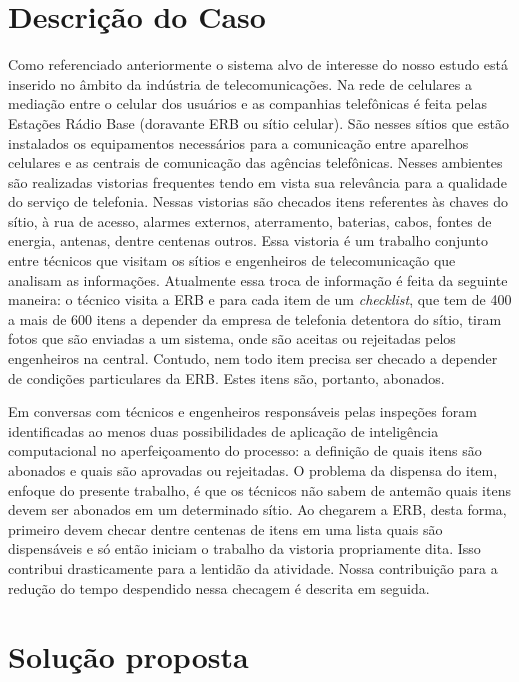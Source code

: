\documentclass[
	12pt,				%
	openany,			%
	oneside,			%
	a4paper,			%
	english,			%
	french,				%
	spanish,			%
	brazil,				%
	]{abntex2}
\begin{document}
\chapter[Descrição do Caso]{Descrição do Caso}
Como referenciado anteriormente o sistema alvo de interesse do nosso estudo está
inserido no âmbito da indústria de telecomunicações. Na rede de celulares a
mediação entre o celular dos usuários e as companhias telefônicas é feita pelas
Estações Rádio Base (doravante ERB ou sítio celular). São nesses sítios que
estão instalados os equipamentos necessários para a comunicação entre aparelhos
celulares e as centrais de comunicação das agências telefônicas. Nesses
ambientes são realizadas vistorias frequentes tendo em vista sua relevância para
a qualidade do serviço de telefonia. Nessas vistorias são checados itens
referentes às chaves do sítio, à rua de acesso, alarmes externos, aterramento,
baterias, cabos, fontes de energia, antenas, dentre centenas outros. Essa
vistoria é um trabalho conjunto entre técnicos que visitam os sítios e
engenheiros de telecomunicação que analisam as informações. Atualmente essa
troca de informação é feita da seguinte maneira: o técnico visita a ERB e para
cada item de um \textit{checklist}, que tem de 400 a mais de  600 itens a depender
da empresa de telefonia detentora do sítio, tiram fotos que são enviadas a um
sistema, onde são aceitas ou rejeitadas pelos engenheiros na central. Contudo,
nem todo item precisa ser checado a depender de condições particulares da ERB.
Estes itens são, portanto, abonados.

Em conversas com técnicos e engenheiros responsáveis pelas inspeções foram
identificadas ao menos duas possibilidades de aplicação de inteligência
computacional no aperfeiçoamento do processo: a definição de quais itens são
abonados e quais são aprovadas ou rejeitadas. O problema da dispensa do item, enfoque do presente trabalho, é que os técnicos não sabem de antemão quais itens devem ser abonados em um determinado sítio. Ao chegarem a ERB, desta forma, primeiro devem checar dentre centenas de itens em uma lista quais são dispensáveis e só então iniciam o trabalho da vistoria propriamente dita. Isso contribui drasticamente para a lentidão da atividade. Nossa contribuição para a redução do tempo despendido nessa checagem é descrita em seguida.

\chapter[Solução proposta]{Solução proposta}
\end{document}
